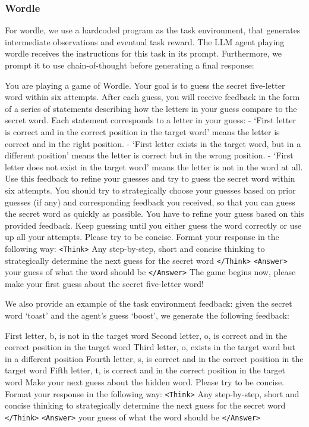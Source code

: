 \documentclass{article}
\theoremstyle{plain}
\theoremstyle{definition}
\theoremstyle{remark}
\begin{document}
\subsubsection{Wordle}
For wordle, we use a hardcoded program as the task environment, that generates intermediate observations and eventual task reward. The LLM agent playing wordle receives the instructions for this task in its prompt. Furthermore, we prompt it to use chain-of-thought before generating a final response:
\begin{tcolorbox}[colback=gray!20, colframe=black, title=Wordle Agent Prompt]
You are playing a game of Wordle. Your goal is to guess the secret five-letter word within six attempts. After each guess, you will receive feedback in the form of a series of statements describing how the letters in your guess compare to the secret word. Each statement corresponds to a letter in your guess:
- `First letter is correct and in the correct position in the target word' means the letter is correct and in the right position.
- `First letter exists in the target word, but in a different position' means the letter is correct but in the wrong position.
- `First letter does not exist in the target word' means the letter is not in the word at all.
Use this feedback to refine your guesses and try to guess the secret word within six attempts. You should try to strategically choose your guesses based on prior guesses (if any) and corresponding feedback you received, so that you can guess the secret word as quickly as possible.
You have to refine your guess based on this provided feedback. Keep guessing until you either guess the word correctly or use up all your attempts.
Please try to be concise. Format your response in the following way: \texttt{<Think>} Any step-by-step, short and concise thinking to strategically determine the next guess for the secret word \texttt{</Think>}
\texttt{<Answer>} your guess of what the word should be \texttt{</Answer>}
The game begins now, please make your first guess about the secret five-letter word!
\end{tcolorbox}
We also provide an example of the task environment feedback: given the secret word `toast' and the agent's guess `boost', we generate the following feedback:
\begin{tcolorbox}[colback=gray!20, colframe=black, title=Wordle Task Environment Feedback]
First letter, b, is not in the target word
Second letter, o, is correct and in the correct position in the target word
Third letter, o, exists in the target word but in a different position
Fourth letter, s, is correct and in the correct position in the target word
Fifth letter, t, is correct and in the correct position in the target word
Make your next guess about the hidden word. Please try to be concise. Format your response in the following way: \texttt{<Think>} Any step-by-step, short and concise thinking to strategically determine the next guess for the secret word \texttt{</Think>}
\texttt{<Answer>} your guess of what the word should be \texttt{</Answer>}
\end{tcolorbox}
\newpage
\end{document}

